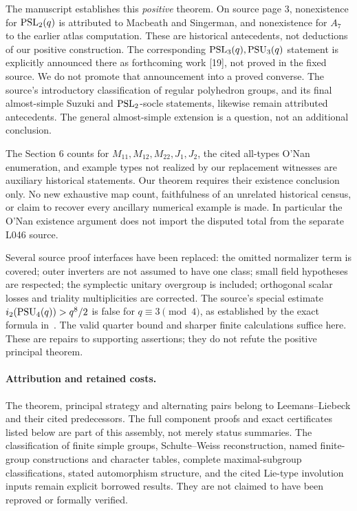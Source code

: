 \documentclass[11pt,a4paper]{article}
\newcommand{\ii}{i_2}\newcommand{\nuu}{\nu_2}
\begin{document}
The manuscript establishes this \emph{positive} theorem. On source page 3,
nonexistence for $\operatorname{PSL}_2(q)$ is attributed to Macbeath and Singerman,
and nonexistence for $A_7$ to the earlier atlas computation. These are
historical antecedents, not deductions of our positive construction.
The corresponding $\operatorname{PSL}_3(q),\operatorname{PSU}_3(q)$ statement is explicitly announced
there as forthcoming work [19], not proved in the fixed source. We do
not promote that announcement into a proved converse. The source's
introductory classification of regular polyhedron groups, and its final
almost-simple Suzuki and $\operatorname{PSL}_2$-socle statements, likewise remain
attributed antecedents. The general almost-simple extension is a question,
not an additional conclusion.

The Section 6 counts for $M_{11},M_{12},M_{22},J_1,J_2$, the cited
all-types O'Nan enumeration, and example types not realized by our
replacement witnesses are auxiliary historical statements. Our theorem
requires their existence conclusion only. No new exhaustive map count,
faithfulness of an unrelated historical census, or claim to recover every
ancillary numerical example is made. In particular the O'Nan existence
argument does not import the disputed total from the separate L046 source.

Several source proof interfaces have been replaced: the omitted normalizer
term is covered; outer inverters are not assumed to have one class; small
field hypotheses are respected; the symplectic unitary overgroup is included;
orthogonal scalar losses and triality multiplicities are corrected.
The source's special estimate $\ii(\PSU_4(q))>q^8/2$ is false for
$q\equiv3\pmod4$, as established by the exact formula in~\cite{Lower}.
The valid quarter bound and sharper finite calculations suffice here.
These are repairs to supporting assertions; they do not refute the
positive principal theorem.

\paragraph{Attribution and retained costs.}
The theorem, principal strategy and alternating pairs belong to
Leemans--Liebeck and their cited predecessors. The full component proofs
and exact certificates listed below are part of this assembly, not merely
status summaries. The classification of finite simple groups, Schulte--Weiss
reconstruction, named finite-group constructions and character tables,
complete maximal-subgroup classifications, stated automorphism structure,
and the cited Lie-type involution inputs remain explicit borrowed results.
They are not claimed to have been reproved or formally verified.
\end{document}
